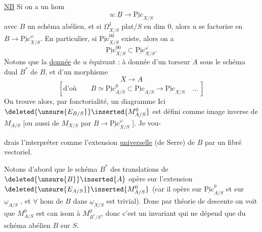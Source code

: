 \uline{NB} Si on a un hom
\[
u:\underline{B}\longrightarrow\underline{\mathrm{Pic}}_{X/S}
\]
avec $B$ un schéma abélien, et si $\underline{\Omega}^1_{X/S}$  plat/$S$ en dim 0, alors $u$ se factorise en $B\longrightarrow\underline{\mathrm{Pic}}^\omega_{X/S}$. En particulier, si $\underline{\mathrm{Pic}}^{00}_{X/S}$ existe, alors on a
\[
\underline{\mathrm{Pic}}^{00}_{X/S}\subset\underline{\mathrm{Pic}}^\omega_{X/S}.
\]
Notons que la \uline{donnée} de $u$ équivaut : à  donnée d'un torseur $A$ sous  le schéma dual $B^*$ de $B$, et d'un morphisme
\[
X\longrightarrow A
\]
\[
[\text{d'où}\qquad B\simeq\underline{\mathrm{Pic}}^0_{A/S}\subset\underline{\mathrm{Pic}}_{A/S}\longrightarrow\underline{\mathrm{Pic}}_{X/S}\quad\ldots\ ]
\]
On trouve alors, par fonctorialité, un diagramme
Ici $\deleted{\unsure{E_{B/S}}}\inserted{M^0_{A/S}}$ est défini comme image inverse de $M_{A/S}$  [ou aussi de $M_{X/S}$ par $B\longrightarrow\underline{\mathrm{Pic}}^\omega_{X/S}$ ]. Je vou-

drais l'interpréter comme l'extension \uline{universelle} (de Serre) de $B$ par un fibré vectoriel.

Notons d'abord que le schéma $B^*$ des translations de $\deleted{\unsure{B}}\inserted{A}$ opère  sur l'extension $\deleted{\unsure{E_{A/S}}}\inserted{M^0_{A/S}}$ (car il opère  sur $\underline{\mathrm{Pic}}^0_{A/S}$ et sur $\underline{\omega}_{A/S}$ \deleted{\unsure{\}}}, et $\forall$ hom de $B$ dans $\underline{\omega}_{X/S}$ est trivial). Donc par théorie de descente on voit que $M^0_{A/S}$ est can isom à $M^0_{B^*/S}$, donc c'est un invariant qui ne dépend que du  schéma abélien $B$ sur $S$.

